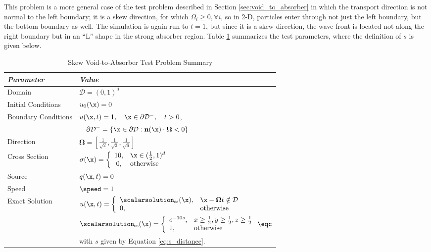 This problem is a more general case of the test problem described in
Section \ref{sec:void_to_absorber} in which the transport direction is
not normal to the left boundary; it is a skew direction, for which
$\Omega_i\ge 0,\forall i$, so in 2-D, particles enter through not just the left
boundary, but the bottom boundary as well.
The simulation is again run to $t=1$, but since it is a skew direction,
the wave front is located not along the right boundary but in an ``L''
shape in the strong absorber region.
Table \ref{tab:void_to_absorber_skew} summarizes the test parameters,
where the definition of $s$ is given below.

\begin{table}[htb]\caption{Skew Void-to-Absorber Test Problem Summary}
\label{tab:void_to_absorber_skew}
\centering
\begin{tabular}{l l}\toprule
\emph{Parameter} & \emph{Value}\\\midrule
Domain & $\mathcal{D} = (0,1)^d$\\
Initial Conditions & $u_0(\x)=0$\\
Boundary Conditions & $u(\x,t)=1,\quad \x\in\partial\mathcal{D}^-,\quad t>0$,\\
   & $\quad\partial\mathcal{D}^-=\{\x\in\partial\mathcal{D}:\mathbf{n}(\x)
       \cdot\mathbf{\Omega}<0\}$\\
Direction & $\mathbf{\Omega} = \left[\frac{1}{\sqrt{2}},\frac{1}{\sqrt{3}},
   \frac{1}{\sqrt{6}}\right]$\\
Cross Section & $\sigma(\x)=\left\{\begin{array}{c l}
   10, & \x\in(\frac{1}{2},1)^d\\
   0,  & \mbox{otherwise}\end{array}\right.$\\
Source & $q(\x,t)=0$\\
Speed & $\speed=1$\\
Exact Solution & $u(\x,t)=\left\{\begin{array}{l l}
   \scalarsolution_{\text{ss}}(\x), & \x-\mathbf{\Omega}t\notin\mathcal{D}\\
   0, & \mbox{otherwise}
   \end{array}\right.$ \\
   & $\scalarsolution_{\text{ss}}(\x) =
       \left\{\begin{array}{l l}
         e^{-10s}, & x\ge\frac{1}{2}, y\ge\frac{1}{2}, z\ge\frac{1}{2}\\
         1,        & \mbox{otherwise}
       \end{array}\right. \eqc$\\
   & with $s$ given by Equation \eqref{eq:s_distance}.\\
\bottomrule\end{tabular}
\end{table}


